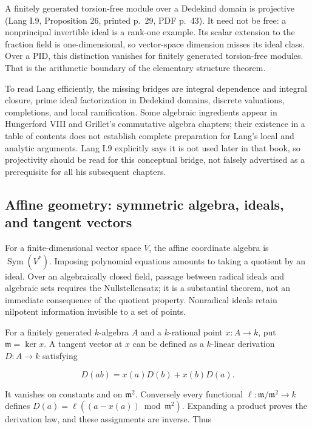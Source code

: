 \documentclass[
  11pt,
]{article}
\begin{document}
A finitely generated torsion-free module over a Dedekind domain is
projective (Lang I.9, Proposition 26, printed p.~29, PDF p.~43). It need
not be free: a nonprincipal invertible ideal is a rank-one example. Its
scalar extension to the fraction field is one-dimensional, so
vector-space dimension misses its ideal class. Over a PID, this
distinction vanishes for finitely generated torsion-free modules. That
is the arithmetic boundary of the elementary structure theorem.

To read Lang efficiently, the missing bridges are integral dependence
and integral closure, prime ideal factorization in Dedekind domains,
discrete valuations, completions, and local ramification. Some algebraic
ingredients appear in Hungerford VIII and Grillet's commutative algebra
chapters; their existence in a table of contents does not establish
complete preparation for Lang's local and analytic arguments. Lang I.9
explicitly says it is not used later in that book, so projectivity
should be read for this conceptual bridge, not falsely advertised as a
prerequisite for all his subsequent chapters.

\subsection{Affine geometry: symmetric algebra, ideals, and tangent
vectors}\label{affine-geometry-symmetric-algebra-ideals-and-tangent-vectors}

For a finite-dimensional vector space \(V\), the affine coordinate
algebra is \(\operatorname{Sym}(V^*)\). Imposing polynomial equations
amounts to taking a quotient by an ideal. Over an algebraically closed
field, passage between radical ideals and algebraic sets requires the
Nullstellensatz; it is a substantial theorem, not an immediate
consequence of the quotient property. Nonradical ideals retain nilpotent
information invisible to a set of points.

For a finitely generated \(k\)-algebra \(A\) and a \(k\)-rational point
\(x:A\to k\), put \(\mathfrak m=\ker x\). A tangent vector at \(x\) can
be defined as a \(k\)-linear derivation \(D:A\to k\) satisfying

\[D(ab)=x(a)D(b)+x(b)D(a).\]

It vanishes on constants and on \(\mathfrak m^2\). Conversely every
functional \(\ell:\mathfrak m/\mathfrak m^2\to k\) defines
\(D(a)=\ell((a-x(a))\bmod\mathfrak m^2)\). Expanding a product proves
the derivation law, and these assignments are inverse. Thus
\end{document}
